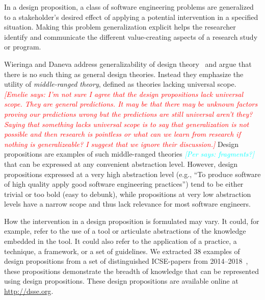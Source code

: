 \documentclass[graybox]{svmult}
\newcommand{\emelie}[1]{\textcolor{red}{{\it [Emelie says: #1]}}}
\newcommand{\per}[1]{\textcolor{cyan}{{\it [Per says: #1]}}}
\newcommand{\emelie}[1]{}
\newcommand{\per}[1]{}
\begin{document}
In a design proposition, a class of software engineering problems are generalized to a stakeholder's desired effect of applying a potential intervention in a specified situation. 
Making this problem generalization explicit helps the researcher identify and communicate the different value-creating aspects of a research study or program.

Wieringa and Daneva address generalizability of design theory~\cite{wieringa_six_2015} and argue that there is no such thing as general design theories. Instead they emphasize the utility of \emph{middle-ranged theory}, defined as theories lacking universal scope. \emelie{I'm not sure I agree that the design propositions lack universal scope. They are general predictions. It may be that there may be unknown factors proving our predictions wrong but the predictions are still universal aren't they? Saying that something lacks universal scope is to say that generalization is not possible and then research is pointless or what can we learn from research if nothing is generalizeable? I suggest that we ignore their discussion.}
Design propositions are examples of such middle-ranged theories \per{fragments?} that can be expressed at any convenient abstraction level. However, design propositions expressed at a very high abstraction level (e.g., ``To produce software of high quality apply good software engineering practices'') tend to be either trivial or too bold (easy to debunk), while propositions at very low abstraction levels have a narrow scope and thus lack relevance for most software engineers. 

How the intervention in a design proposition is formulated may vary. It could, for example, refer to the use of a tool or articulate abstractions of the knowledge embedded in the tool. It could also refer to the application of a practice, a technique, a framework, or a set of guidelines. We extracted 38 examples of design propositions from a set of distinguished ICSE-papers from 2014--2018~\cite{Engstrom19arxiv}, these propositions demonstrate the breadth of knowledge that can be represented using design propositions. These design propositions are available online at \url{http://dsse.org}.
\end{document}
